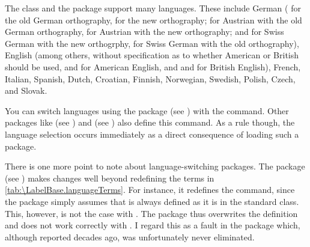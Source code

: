 The  class and the  package support many
languages. These include German ( for
the old German orthography,  for the new orthography;
 for Austrian with the old German orthography,
 for Austrian with the
new orthography; and 
for Swiss German with the new orthogrphy,  for Swiss
German with the old orthography), English (among
others,  without specification as to whether American or
British should be used,  and  for American
English, and  and  for British English),
French, Italian,
Spanish, Dutch,
Croatian, Finnish,
Norwegian,
Swedish,
Polish,
Czech, and Slovak.

You can switch languages using the  package
(see \cite{package:babel}) with the 
command.  Other packages like  (see
\cite{package:german}) and  (see
\cite{package:ngerman}) also define this command.  As a rule though, the
language selection occurs immediately as a direct consequence of loading such
a package.
\iffalse%
For details, please refer to the documentation of the relevant packages.
\fi

There is one more point to note about language-switching
packages. The
 package (see
\cite{package:french}) makes changes well beyond redefining the terms in
\autoref{tab:\LabelBase.languageTerms}. For instance, it redefines the
 command, since the package simply assumes that
 is always defined as it is in the standard
 class. This, however, is not the case with \KOMAScript{}. The
 package thus overwrites the definition and does not work
correctly with \KOMAScript. I regard this as a fault in the 
package which, although reported decades ago, was unfortunately never
eliminated.

